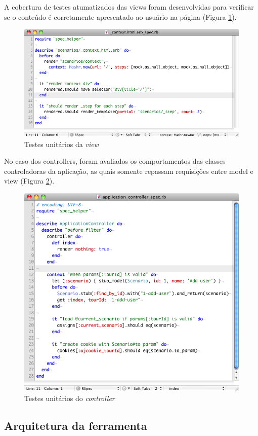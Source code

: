 A cobertura de testes atumatizados das views foram desenvolvidas para verificar se o conteúdo é corretamente apresentado ao usuário na página (Figura \ref{figura_34}).

\pagebreak

\begin{figure}[htpb]
    \centering
    \includegraphics[width=0.7 \textwidth]{figuras/figura_34}
    \caption{Testes unitários da \textit{view}}
    \label{figura_34}
\end{figure}

No caso dos controllers, foram avaliados os comportamentos das classes controladoras da aplicação, as quais somente repassam requisições entre model e view (Figura \ref{figura_35}).

\begin{figure}[htpb]
    \centering
    \includegraphics[width=0.7 \textwidth]{figuras/figura_35}
    \caption{Testes unitários do \textit{controller}}
    \label{figura_35}
\end{figure}

\subsection{Arquitetura da ferramenta}

